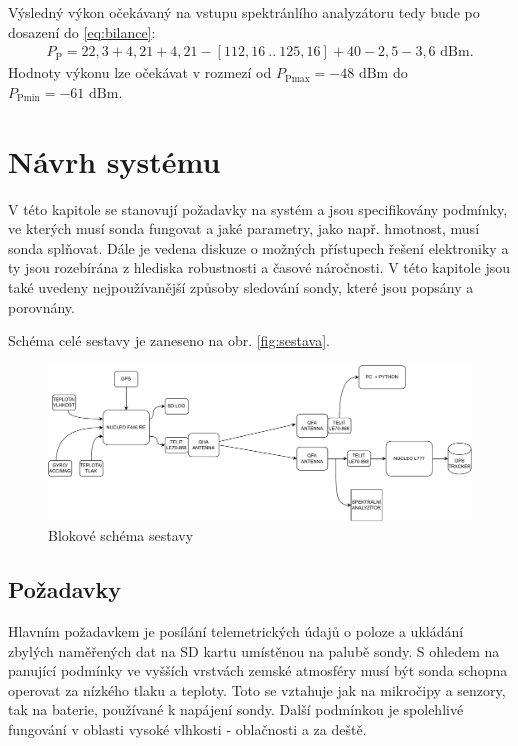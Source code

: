 \documentclass[twoside]{ctuthesis}
\newcommand{\mt}[1]{\text{#1}}
\theoremstyle{plain}
\theoremstyle{definition}
\theoremstyle{note}
\begin{document}
		Výsledný výkon očekávaný na vstupu spektránlího analyzátoru tedy bude po dosazení do \eqref{eq:bilance}:
		\begin{align}
			P_\mt{P} = 22{,}3 + 4{,}21 + 4{,}21 - [112{,}16~..~125{,}16] + 40 - 2{,}5 - 3{,}6\mt{ dBm}.
		\end{align}
		Hodnoty výkonu lze očekávat v rozmezí od $P_\mt{Pmax} = -48\mt{ dBm}$ do $P_\mt{Pmin} = -61\mt{ dBm}$.















\chapter{Návrh systému}
V této kapitole se stanovují požadavky na systém a jsou specifikovány podmínky, ve kterých musí sonda fungovat a jaké parametry, jako např. hmotnost, musí sonda splňovat. Dále je vedena  diskuze o možných přístupech řešení elektroniky a ty jsou rozebírána z hlediska robustnosti a časové náročnosti. V této kapitole jsou také uvedeny nejpoužívanější způsoby sledování sondy, které jsou popsány a porovnány.

Schéma celé sestavy je zaneseno na obr. \ref{fig:sestava}.
\begin{figure}
	\centering
	\includegraphics[width=\textwidth]{Figures/sonda_blokac.drawio.pdf}
	\caption{Blokové schéma sestavy}
	\label{fig:sestava:blokac}
\end{figure}

	\section{Požadavky}
	Hlavním požadavkem je posílání telemetrických údajů o poloze a ukládání zbylých naměřených dat na SD kartu umístěnou na palubě sondy. S ohledem na panující podmínky ve vyšších vrstvách zemské atmosféry musí být sonda schopna operovat za nízkého tlaku a teploty. Toto se vztahuje jak na mikročipy a senzory, tak na baterie, používané k napájení sondy. Další podmínkou je spolehlivé fungování v oblasti vysoké vlhkosti - oblačnosti a za deště. 
\end{document}
